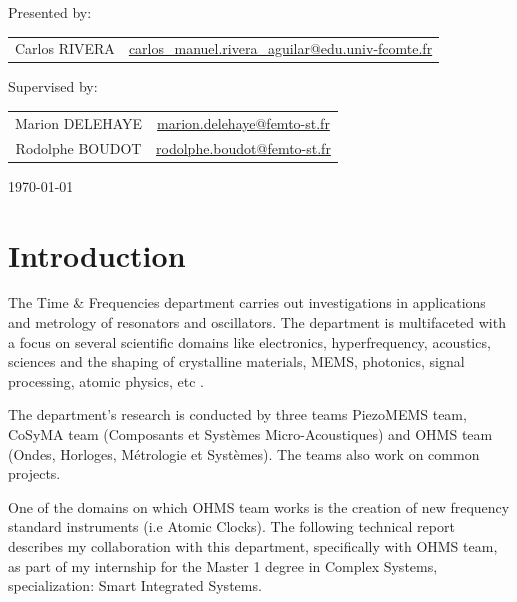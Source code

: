 \documentclass[a4paper,12pt]{article}
\begin{document}
\begin{titlepage}
\begin{center}
\vspace{2cm}
Presented by:\\ [0.4cm]
\begin{tabular}{ c    |    c } 
    Carlos RIVERA &  \normalsize \href{mailto:carlos_manuel.rivera_aguilar@edu.univ-fcomte.fr}{carlos\_manuel.rivera\_aguilar@edu.univ-fcomte.fr}
\end{tabular}
\end{center}
\vspace{2cm}
\begin{center}
Supervised by:\\ [0.4cm]
\begin{tabular}{ c    |    c } 
    Marion DELEHAYE &  \normalsize \href{mailto:marion.delehaye@femto-st.fr}{marion.delehaye@femto-st.fr} \\
    Rodolphe BOUDOT &  \normalsize \href{mailto:rodolphe.boudot@femto-st.fr}{rodolphe.boudot@femto-st.fr}
\end{tabular}
\end{center}
\vfill
{\large \today}\\[1cm] 
\vfill 

\end{titlepage}
  
\tableofcontents
\thispagestyle{empty}
\listoffigures
\thispagestyle{empty}
\lstlistoflistings
\thispagestyle{empty}
\pagebreak

\setcounter{page}{1}

\section{Introduction} 
The Time \& Frequencies department carries out investigations in applications and metrology of resonators and oscillators. The department is multifaceted with a focus on several scientific domains like electronics, hyperfrequency, acoustics, sciences and the shaping of crystalline materials, MEMS, photonics, signal processing, atomic physics, etc \cite{2022}.

The department’s research is conducted by three teams PiezoMEMS team, CoSyMA team (Composants et Systèmes Micro-Acoustiques) and OHMS team (Ondes, Horloges, Métrologie et Systèmes). The teams also work on common projects.

One of the domains on which OHMS team works is the creation of new frequency standard instruments (i.e Atomic Clocks). The following technical report describes my collaboration with this department, specifically with OHMS team, as part of my internship for the Master 1 degree in Complex Systems, specialization: Smart Integrated Systems.
\end{document}
